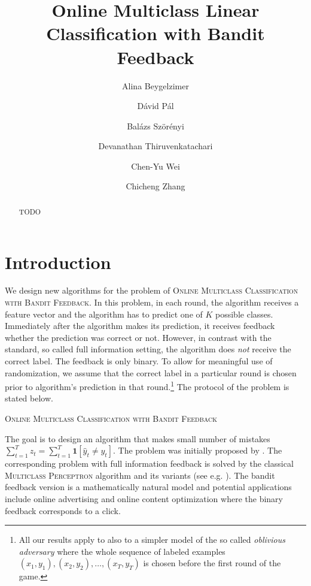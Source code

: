 \documentclass[12pt]{article}
\title{Online Multiclass Linear Classification with Bandit Feedback}
\author{
Alina Beygelzimer \and
D\'avid P\'al \and
Bal\'azs Sz\"or\'enyi \and
Devanathan Thiruvenkatachari \and
Chen-Yu Wei \and
Chicheng Zhang
}
\newcommand{\indicator}[1]{\mathbf{1}\left[#1 \right]} %
\begin{document}
\maketitle

\begin{abstract}
TODO
\end{abstract}

\section{Introduction}
\label{section:introduction}

We design new algorithms for the problem of \textsc{Online Multiclass
Classification with Bandit Feedback}. In this problem, in each round, the
algorithm receives a feature vector and the algorithm has to predict one of $K$
possible classes. Immediately after the algorithm makes its prediction, it
receives feedback whether the prediction was correct or not. However, in
contrast with the standard, so called full information setting, the algorithm
does \emph{not} receive the correct label. The feedback is only binary. To allow
for meaningful use of randomization, we assume that the correct label in a
particular round is chosen prior to algorithm's prediction in that
round.\footnote{All our results apply to also to a simpler model of
the so called \emph{oblivious adversary} where the whole sequence of labeled
examples $(x_1, y_1), (x_2, y_2), \dots, (x_T, y_T)$ is chosen before the first
round of the game.} The protocol of the problem is stated below.

\begin{algorithm}[h]
\caption{\textsc{Online Multiclass Classification with Bandit Feedback}
\label{algorithm:game-protocol}}
\begin{algorithmic}[1]
{
\ENDFOR
}
\end{algorithmic}
\end{algorithm}

The goal is to design an algorithm that makes small number of mistakes
$\sum_{t=1}^T z_t = \sum_{t=1}^T \indicator{\widehat y_t \neq y_t}$. The problem
was initially proposed by \cite{Kakade-Shalev-Shwartz-Tewari-2008}. The
corresponding problem with full information feedback is solved by the classical
\textsc{Multiclass Perceptron} algorithm and its variants (see e.g.
\cite{Crammer-Dekel-Keshet-Shalev-Shwartz-Singer-2006}). The bandit feedback
version is a mathematically natural model and potential applications include
online advertising and online content optimization where the binary feedback
corresponds to a click.
\end{document}
